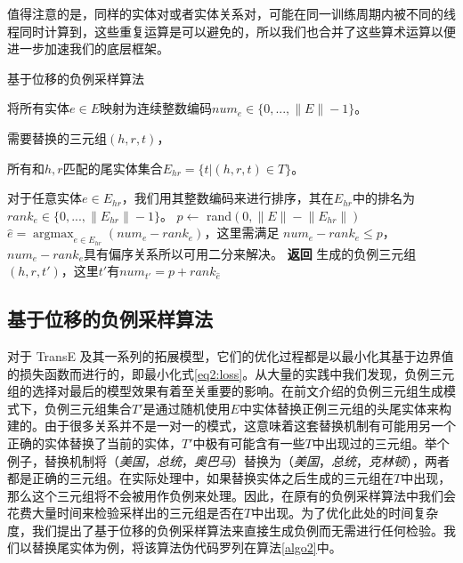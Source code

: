 值得注意的是，同样的实体对或者实体关系对，可能在同一训练周期内被不同的线程同时计算到，这些重复运算是可以避免的，所以我们也合并了这些算术运算以便进一步加速我们的底层框架。



\begin{algorithm}[t]
  \caption{基于位移的负例采样算法}
  \label{algo2}
  \begin{algorithmic}[1]
      \Ensure 将所有实体$e \in E$映射为连续整数编码$num_e \in \{0, ..., \lVert E \rVert  - 1\}$。
        \Require 

        需要替换的三元组$(h, r, t)$，

        所有和$h, r$匹配的尾实体集合$E_{hr} = \{t|(h,r,t)\in T\}$。

        对于任意实体$e \in E_{hr}$，我们用其整数编码来进行排序，其在$E_{hr}$中的排名为$rank_e \in \{0, ..., \lVert E_{hr} \rVert  - 1\}$。
        \State $p \leftarrow $ rand$(0, \lVert E \rVert - \lVert E_{hr} \rVert)$
        \State $\hat{e} = \mathop{\arg\max}_{e \in E_{hr}} (num_{e}-rank_{e})$，这里需满足 $num_{e}-rank_{e} \leq p$，$num_{e}-rank_{e}$具有偏序关系所以可用二分来解决。
        \State \textbf{返回} 生成的负例三元组$(h, r, t')$，这里$t'$有$num_{t'} = p + rank_{\hat{e}}$
  \end{algorithmic}
\end{algorithm}



\subsection{基于位移的负例采样算法}

对于 TransE 及其一系列的拓展模型，它们的优化过程都是以最小化其基于边界值的损失函数而进行的，即最小化式\ref{eq2:loss}。从大量的实践中我们发现，负例三元组的选择对最后的模型效果有着至关重要的影响。在前文介绍的负例三元组生成模式下，负例三元组集合$T'$是通过随机使用$E$中实体替换正例三元组的头尾实体来构建的。由于很多关系并不是一对一的模式，这意味着这套替换机制有可能用另一个正确的实体替换了当前的实体，$T'$中极有可能含有一些$T$中出现过的三元组。举个例子，替换机制将（\emph{美国}，\emph{总统}，\emph{奥巴马}）替换为（\emph{美国}，\emph{总统}，\emph{克林顿}），两者都是正确的三元组。在实际处理中，如果替换实体之后生成的三元组在$T$中出现，那么这个三元组将不会被用作负例来处理。因此，在原有的负例采样算法中我们会花费大量时间来检验采样出的三元组是否在$T$中出现。为了优化此处的时间复杂度，我们提出了基于位移的负例采样算法来直接生成负例而无需进行任何检验。我们以替换尾实体为例，将该算法伪代码罗列在算法\ref{algo2}中。

